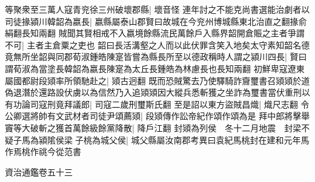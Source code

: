 等聚衆至三萬人寇青兖徐三州破壞郡縣|{
	壞音怪}
連年討之不能克尚書選能治劇者以司徒掾潁川韓韶為嬴長|{
	嬴縣屬泰山郡賢曰故城在今兖州博城縣東北治直之翻掾俞絹翻長知兩翻}
賊聞其賢相戒不入嬴境餘縣流民萬餘戶入縣界韶開倉賑之主者爭謂不可|{
	主者主倉粟之吏也}
韶曰長活溝壑之人而以此伏罪含笑入地矣太守素知韶名德竟無所坐韶與同郡荀淑鍾皓陳寔皆嘗為縣長所至以德政稱時人謂之潁川四長|{
	賢曰謂荀淑為當塗長韓韶為嬴長陳寔為太丘長鍾皓為林慮長也長知兩翻}
初鮮卑寇遼東屬國都尉段熲率所領馳赴之|{
	熲古迥翻}
既而恐賊驚去乃使驛騎詐齎璽書召熲熲於道偽退潛於還路設伏虜以為信然乃入追熲熲因大縱兵悉斬獲之坐詐為璽書當伏重刑以有功論司寇刑竟拜議郎|{
	司寇二歲刑璽斯氏翻}
至是詔以東方盜賊昌熾|{
	熾尺志翻}
令公卿選將帥有文武材者司徒尹頌薦熲|{
	段熲傳作訟帝紀作頌作頌為是}
拜中郎將擊舉竇等大破斬之獲首萬餘級餘黨降散|{
	降戶江翻}
封熲為列侯　冬十二月地震　封梁不疑子馬為潁隂侯梁子桃為城父侯|{
	城父縣屬汝南郡考異曰袁紀馬桃封在建和元年馬作焉桃作祧今從范書}


資治通鑑卷五十三
